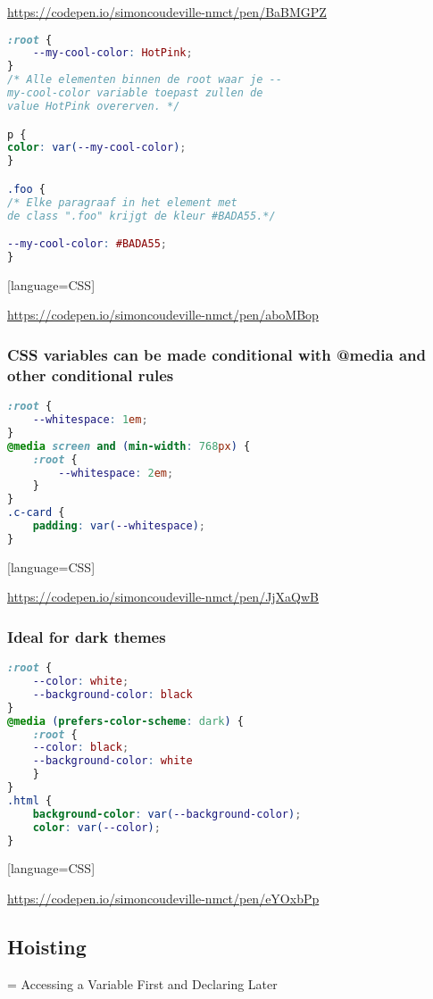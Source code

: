 \documentclass{article}
\begin{document}
\url{https://codepen.io/simoncoudeville-nmct/pen/BaBMGPZ}

\begin{lstlisting}[language=CSS]
:root {
    --my-cool-color: HotPink;
}
/* Alle elementen binnen de root waar je --
my-cool-color variable toepast zullen de
value HotPink overerven. */

p {
color: var(--my-cool-color);
}

.foo {
/* Elke paragraaf in het element met
de class ".foo" krijgt de kleur #BADA55.*/

--my-cool-color: #BADA55;
}
\end{lstlisting}[language=CSS]

\url{https://codepen.io/simoncoudeville-nmct/pen/aboMBop}

\subsubsection{CSS variables can be made conditional with @media and other conditional rules}

\begin{lstlisting}[language=CSS]
:root {
    --whitespace: 1em;
}
@media screen and (min-width: 768px) {
    :root {
        --whitespace: 2em;
    }
}
.c-card {
    padding: var(--whitespace);
}

\end{lstlisting}[language=CSS]


\url{https://codepen.io/simoncoudeville-nmct/pen/JjXaQwB}

\subsubsection{Ideal for dark themes}

\begin{lstlisting}[language=CSS]
:root {
    --color: white;
    --background-color: black
}
@media (prefers-color-scheme: dark) {
    :root {
    --color: black;
    --background-color: white
    }
}
.html {
    background-color: var(--background-color);
    color: var(--color);
}
\end{lstlisting}[language=CSS]

\url{https://codepen.io/simoncoudeville-nmct/pen/eYOxbPp}

\subsection{Hoisting}
= Accessing a Variable First and Declaring Later
\end{document}

